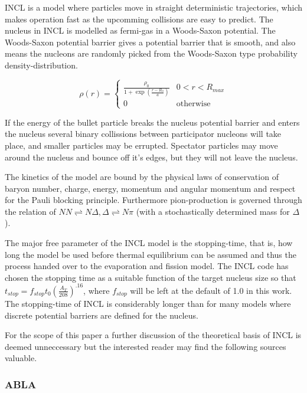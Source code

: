 INCL is a model where particles move in straight deterministic trajectories, which makes operation fast as the upcomming collisions are easy to predict. The nucleus in INCL is modelled as fermi-gas in a Woods-Saxon potential. The Woods-Saxon potential barrier gives a potential barrier that is smooth, and also means the nucleons are randomly picked from the Woods-Saxon type probability density-distribution.

\begin{equation}
\rho(r) = \begin{cases}
\frac{\rho_{0}}{1+\exp({\frac{r-R_{0}}{a}})} & 0 < r < R_{max} \\
0 & \text{otherwise}
\end{cases}
\label{WoodsSaxon}
\end{equation}

If the energy of the bullet particle breaks the nucleus potential barrier and enters the nucleus several binary collissions between participator nucleons will take place, and smaller particles may be errupted. Spectator particles may move around the nucleus and bounce off it's edges, but they will not leave the nucleus.

The kinetics of the model are bound by the physical laws of conservation of baryon number, charge, energy, momentum and angular momentum and respect for the Pauli blocking principle. Furthermore pion-production is governed through the relation of $NN \rightleftharpoons N\Delta, \Delta \rightleftharpoons N\pi$ (with a stochastically determined mass for $\Delta$).

The major free parameter of the INCL model is the stopping-time, that is, how long the model be used before thermal equilibrium can be assumed and thus the process handed over to the evaporation and fission model. The INCL code has chosen the stopping time as a suitable function of the target nucleus size so that $t_{stop} = f_{stop}t_0(\frac{A_T}{208})^.16$, where $f_{stop}$ will be left at the default of 1.0 in this work. The stopping-time of INCL is considerably longer than for many models where discrete potential barriers are defined for the nucleus.

For the scope of this paper a further discussion of the theoretical basis of INCL is deemed unneccessary but the interested reader may find the following sources valuable. ~\cite{PhysRevC.66.044615} ~\cite{iia}

\subsubsection{ABLA}

